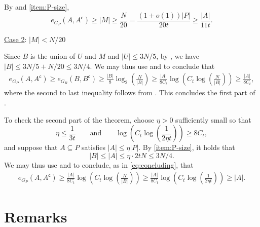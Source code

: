 \documentclass[11pt,a4paper,oneside,reqno]{amsart}
\begin{document}
\vspace{0.2cm}

By  and  \ref{item:P-size},
\[
  e_{G_P}(A, A^{\mathsf{c}}) \ge |M| \ge \frac{N}{20} = \frac{(1+o(1))|P|}{20t} \ge \frac{|A|}{11t}.
\]

\vspace{0.2cm}

\noindent \underline{Case 2}: $|M| < N / 20$

\vspace{0.2cm}

Since $B$ is the union of $U$ and $M$ and $|U| \le 3N/5$, by , we have $|B| \le 3N/5 + N/20 \leq 3N/4$.
We may thus use  and  to conclude that
\begin{align}\label{eq:concluding}
  e_{G_P}(A, A^{\mathsf{c}}) \geq e_{G_R}(B, B^{\mathsf{c}}) \geq \frac{|B|}{8}\log_2\left(\frac{N}{|B|}\right) \ge \frac{|A|}{8C_t}\log\left(C_t\log\left(\frac{N}{|B|}\right)\right)\geq \frac{|A|}{8C_t},
\end{align}
where the second to last inequality follows from . This concludes the first part of . 

To check the second part of the theorem, choose $\eta>0$ sufficiently small so that
\[
  \eta\leq \frac{1}{3t} \qquad \text{and} \qquad \log\left(C_t\log\left(\frac{1}{2\eta t}\right)\right) \geq 8C_t,
\]
and suppose that $A\subseteq P$ satisfies $|A|\leq \eta |P|$.  By  \ref{item:P-size}, it holds that
\[
  |B| \leq |A| \le \eta \cdot 2tN\leq 3N/4.
\]
We may thus use  and  to conclude, as in \eqref{eq:concluding}, that
\begin{align}\label{eq:concluding2}
  e_{G_P}(A, A^{\mathsf{c}}) \geq \frac{|A|}{8C_t}\log\left(C_t\log\left(\frac{N}{|B|}\right)\right) \ge \frac{|A|}{8C_t} \log\left(C_t\log\left(\frac{1}{2\eta t}\right)\right) \ge |A|.
\end{align}



\section{Remarks}\label{sec:remarks}
\end{document}
